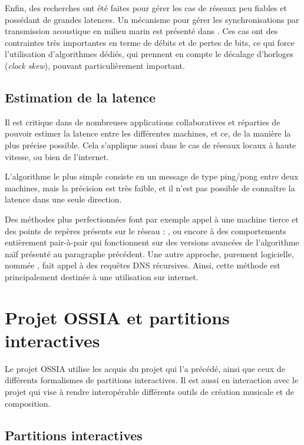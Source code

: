 Enfin, des recherches ont été faites pour gérer les cas de réseaux peu fiables et possédant de grandes latences. Un mécanisme pour gérer les synchronisations par transmission acoustique en milieu marin est présenté dans \cite{syed2006time}. Ces cas ont des contraintes très importantes en terme de débits et de pertes de bits, ce qui force l'utilisation d'algorithmes dédiés, qui prennent en compte le décalage d'horloges (\textit{clock skew}), pouvant particulièrement important.
\subsection{Estimation de la latence}
\label{section:latence}
Il est critique dans de nombreuses applications collaboratives et réparties de pouvoir estimer la latence entre les différentes machines, et ce, de la manière la plus précise possible. Cela s'applique aussi dans le cas de réseaux locaux à haute vitesse, ou bien de l'internet.

L'algorithme le plus simple consiste en un message de type ping/pong entre deux machines, mais la précision est très faible, et il n'est pas possible de connaître la latence dans une seule direction.

Des méthodes plus perfectionnées font par exemple appel à une machine tierce et des points de repères présents sur le réseau : \cite{banerjee2012network}, ou encore à des comportements entièrement pair-à-pair \cite{im2000method} qui fonctionnent sur des versions avancées de l'algorithme naïf présenté au paragraphe précédent. 
Une autre approche, purement logicielle, nommée  \cite{gummadi2002king}, fait appel à des requêtes \ac{DNS} récursives. Ainsi, cette méthode est principalement destinée à une utilisation sur internet.

\section{Projet OSSIA et partitions interactives}
Le projet \ac{OSSIA} utilise les acquis du projet  \cite{baltazar2009virage} qui l'a précédé, ainsi que ceux de différents formalismes de partitions interactives. Il est aussi en interaction avec le projet  \cite{fober2013caracterisation} qui vise à rendre interopérable différents outils de création musicale et de composition.

\subsection{Partitions interactives}
